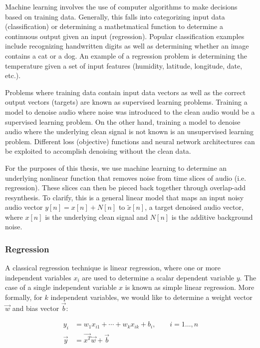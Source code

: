 Machine learning involves the use of computer algorithms to make decisions based on training data. Generally, this falls into categorizing input data (classification) or determining a mathetmatical function to determine a continuous output given an input (regression). Popular classification examples include recognizing handwritten digits as well as determining whether an image contains a cat or a dog. An example of a regression problem is determining the temperature given a set of input features (humidity, latitude, longitude, date, etc.).

Problems where training data contain input data vectors as well as the correct output vectors (targets) are known as supervised learning problems. Training a model to denoise audio where noise was introduced to the clean audio would be a supervised learning problem. On the other hand, training a model to denoise audio where the underlying clean signal is not known is an unsupervised learning problem. Different loss (objective) functions and neural network architectures can be exploited to accomplish denoising without the clean data.

For the purposes of this thesis, we use machine learning to determine an underlying nonlinear function that removes noise from time slices of audio (i.e. regression). These slices can then be pieced back together through overlap-add resynthesis. To clarify, this is a general linear model that maps an input noisy audio vector $y[n]=x[n]+N[n]$ to $\tilde{x}[n]$, a target denoised audio vector, where $x[n]$ is the underlying clean signal and $N[n]$ is the additive background noise.

\subsubsection{Regression}
A classical regression technique is linear regression, where one or more independent variables $x_{i}$ are used to determine a scalar dependent variable $y$. The case of a single independent variable $x$ is known as simple linear regression. More formally, for $k$ independent variables, we would like to determine a weight vector $\vec{w}$ and bias vector $\vec{b}$:

\begin{align}
y_i &= w_{1}x_{i1} + \cdots + w_{k}x_{ik} + b_{i}, \qquad i=1\ldots ,n \\
\vec{y} &= \vec{x^T}\vec{w} + \vec{b}
\end{align}

